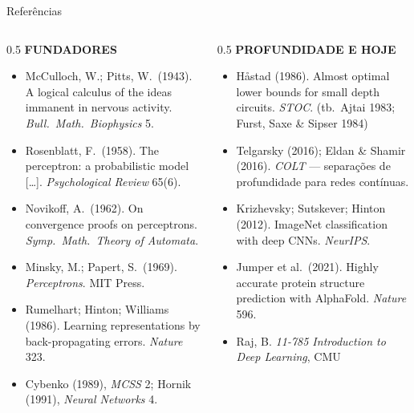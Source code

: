 \documentclass[aspectratio=169, 11pt]{beamer}
\begin{document}
\begin{frame}{Referências}
  \begin{columns}[T]
    \begin{column}{0.5\textwidth}
      {\color{icCinza}\bfseries\scriptsize FUNDADORES}
      {\scriptsize
      \begin{itemize}\setlength{\itemsep}{0.15ex}
        \item McCulloch, W.; Pitts, W.\ (1943). A logical calculus of the
              ideas immanent in nervous activity. \emph{Bull.\ Math.\
              Biophysics} 5.
        \item Rosenblatt, F.\ (1958). The perceptron: a probabilistic model
              [\ldots]. \emph{Psychological Review} 65(6).
        \item Novikoff, A.\ (1962). On convergence proofs on perceptrons.
              \emph{Symp.\ Math.\ Theory of Automata}.
        \item Minsky, M.; Papert, S.\ (1969). \emph{Perceptrons}. MIT Press.
        \item Rumelhart; Hinton; Williams (1986). Learning representations
              by back-propagating errors. \emph{Nature} 323.
        \item Cybenko (1989), \emph{MCSS} 2; Hornik (1991),
              \emph{Neural Networks} 4.
      \end{itemize}}
    \end{column}
    \begin{column}{0.5\textwidth}
      {\color{icCinza}\bfseries\scriptsize PROFUNDIDADE E HOJE}
      {\scriptsize
      \begin{itemize}\setlength{\itemsep}{0.15ex}
        \item Håstad (1986). Almost optimal lower bounds for small depth
              circuits. \emph{STOC}. (tb.\ Ajtai 1983; Furst, Saxe \& Sipser
              1984)
        \item Telgarsky (2016); Eldan \& Shamir (2016). \emph{COLT} —
              separações de profundidade para redes contínuas.
        \item Krizhevsky; Sutskever; Hinton (2012). ImageNet classification
              with deep CNNs. \emph{NeurIPS}.
        \item Jumper et al.\ (2021). Highly accurate protein structure
              prediction with AlphaFold. \emph{Nature} 596.
        \item Raj, B. \emph{11-785 Introduction to Deep Learning}, CMU

\end{itemize}}
\end{column}
\end{columns}
\end{frame}
\end{document}
